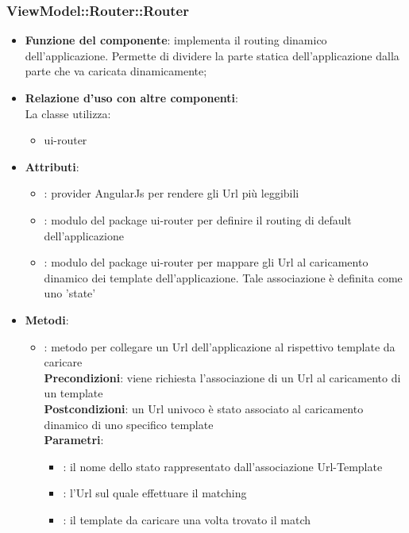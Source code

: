 \subsubsection{ViewModel::Router::Router}
\begin{itemize}
\item\textbf{Funzione del componente}: implementa il routing dinamico dell'applicazione. Permette di dividere la parte statica dell'applicazione dalla parte che va caricata dinamicamente;
	\item\textbf{Relazione d'uso con altre componenti}: \\
La classe utilizza:
	\begin{itemize}
		\item ui-router
	\end{itemize}
\item\textbf{Attributi}:
	\begin{itemize}
		\item{}: provider AngularJs per rendere gli Url più leggibili\\
		\item{}: modulo del package ui-router per definire il routing di default dell'applicazione\\
		\item{}: modulo del package ui-router per mappare gli Url al caricamento dinamico dei template dell'applicazione. Tale associazione è definita come uno 'state'\\
	\end{itemize}
\item\textbf{Metodi}:
	\begin{itemize}
		\item{}: metodo per collegare un Url dell'applicazione al rispettivo template da caricare\\
		\textbf{Precondizioni}: viene richiesta l'associazione di un Url al caricamento di un template\\
		\textbf{Postcondizioni}: un Url univoco è stato associato al caricamento dinamico di uno specifico template\\
		\textbf{Parametri}:
			\begin{itemize}
				\item{}: il nome dello stato rappresentato dall'associazione Url-Template\\
				\item{}: l'Url sul quale effettuare il matching\\
				\item{}: il template da caricare una volta trovato il match\\
			\end{itemize}
	\end{itemize}
\end{itemize}